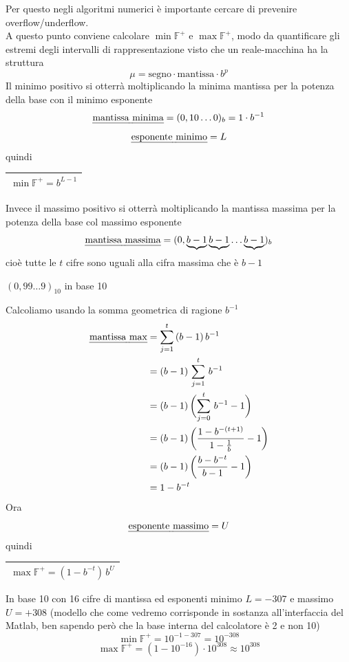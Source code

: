 Per questo negli algoritmi numerici è importante cercare di prevenire overflow/underflow. \\
A questo punto conviene calcolare $\min \mathbb{F}^+$ e $\max \mathbb{F}^+$, modo da quantificare gli estremi degli intervalli di rappresentazione visto che un reale-macchina ha la struttura 
\[\mu = \text{segno} \cdot \text{mantissa} \cdot b^p\]
Il minimo positivo si otterrà moltiplicando la minima mantissa per la potenza della base con il minimo esponente
\[ \text{\uline{mantissa minima}} = (0,10 \dotsc 0)_b = 1 \cdot b^{-1}\]
\[ \text{\uline{esponente minimo}} = L\]
quindi
\begin{table}[h!]
    \centering
    \begin{tabular}{|c|}
    \hline
        $\min \mathbb{F}^+ = b^{L-1}$ \\
    \hline
    \end{tabular}
\end{table}
Invece il massimo positivo si otterrà moltiplicando la mantissa massima per la potenza della base col massimo esponente
\[ \text{\uline{mantissa massima}} = (0,\underbrace{b-1} \underbrace{b-1} \dotsc \underbrace{b-1})_b\]
cioè tutte le $t$ cifre sono uguali alla cifra massima che è $b-1$
\begin{esempio}
$(0,99 \dotsc 9)_{10}$ in base 10
\end{esempio}
Calcoliamo usando la somma geometrica di ragione $b^{-1}$
\[\begin{split}
    \text{\uline{mantissa max}} & = \sum_{j=1}^t\,(b-1)\,b^{-1} \\
    & = (b-1)\,\sum_{j=1}^t\,b^{-1} \\
    & = (b-1)\,\biggl(\sum_{j=0}^t\,b^{-1} - 1\biggr) \\
    & = (b-1)\,\biggl(\frac{1 - b^{-(t+1)}}{1 - \frac{1}{b}} - 1\biggr) \\
    & = (b-1)\,\biggl(\frac{b - b^{-t}}{b - 1} - 1\biggr) \\
    & = 1 - b^{-t} \\
\end{split}\]
Ora \[ \text{\uline{esponente massimo}} = U\] quindi
\begin{table}[h!]
    \centering
    \begin{tabular}{|c|}
    \hline
        $\max \mathbb{F}^+ = (1 - b^{-t})\,b^U$ \\
    \hline
    \end{tabular}
\end{table}
\begin{esempio} 
In base 10 con 16 cifre di mantissa ed esponenti minimo $L = - 307$ e massimo $U = + 308$ (modello che come vedremo corrisponde in sostanza all'interfaccia del Matlab, ben sapendo però che la base interna del calcolatore è 2 e non 10)
\[ \min \mathbb{F}^+ = 10^{- 1 - 307} = 10^{- 308} \]
\[ \max \mathbb{F}^+ = (1 - 10^{-16})\cdot 10^{308} \approx 10^{308}\]
\end{esempio}
